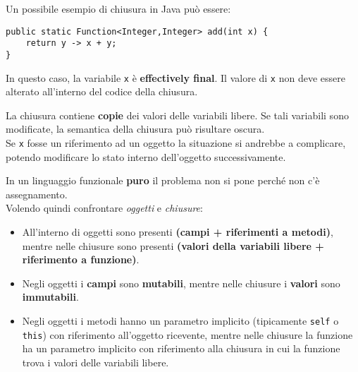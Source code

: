 \documentclass{article}
\begin{document}
Un possibile esempio di chiusura in Java può essere:
\begin{tcolorbox}
\begin{verbatim}
public static Function<Integer,Integer> add(int x) {
    return y -> x + y;
}
\end{verbatim}
\end{tcolorbox}

In questo caso, la variabile \texttt{x} è \textbf{effectively final}. Il valore di \texttt{x} non deve essere alterato all'interno del codice della chiusura.

La chiusura contiene \textbf{copie} dei valori delle variabili libere. Se tali variabili sono modificate, la semantica della chiusura può risultare oscura.\\
Se \texttt{x} fosse un riferimento ad un oggetto la situazione si andrebbe a complicare, potendo modificare lo stato interno dell'oggetto successivamente.

In un linguaggio funzionale \textbf{puro} il problema non si pone perché non c’è assegnamento.\vspace{14pt}\\
Volendo quindi confrontare \textit{oggetti} e \textit{chiusure}:
\begin{itemize}
    \item All'interno di oggetti sono presenti \textbf{(campi + riferimenti a metodi)}, mentre nelle chiusure sono presenti \textbf{(valori della variabili libere + riferimento a funzione)}.
    \item Negli oggetti i \textbf{campi} sono \textbf{mutabili}, mentre nelle chiusure i \textbf{valori} sono \textbf{immutabili}.
    \item Negli oggetti i metodi hanno un parametro implicito (tipicamente \texttt{self} o \texttt{this}) con riferimento all'oggetto ricevente, mentre nelle chiusure la funzione ha un parametro implicito con riferimento alla chiusura in cui la funzione trova i valori delle variabili libere.
\end{itemize}
\end{document}
